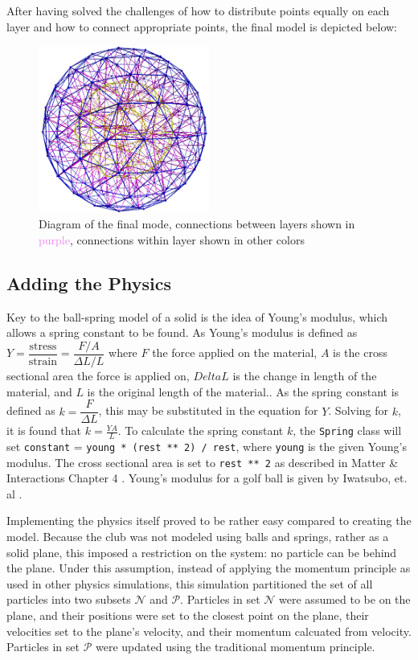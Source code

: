 \documentclass{article}
\begin{document}
After having solved the challenges of how to distribute points equally on each layer and how to connect appropriate points, the final model is depicted below:

\begin{figure}[h]
\centering
\includegraphics[width = 0.5\textwidth]{ball_spring_model.png}
\caption{Diagram of the final mode, connections between layers shown in \textcolor{violet}{purple}, connections within layer shown in other colors}
\label{fig:model}
\end{figure}

\subsection{Adding the Physics}

Key to the ball-spring model of a solid is the idea of Young's modulus, which allows a spring constant to be found. As Young's modulus is defined as $Y = \dfrac{\text{stress}}{\text{strain}} = \dfrac{F/A}{\Delta L/L}$ where $F$ the force applied on the material, $A$ is the cross sectional area the force is applied on, $Delta L$ is the change in length of the material, and $L$ is the original length of the material.. As the spring constant is defined as $k = \dfrac{F}{\Delta L}$, this may be substituted in the equation for $Y$. Solving for $k$, it is found that $k = \frac{YA}{L}$. To calculate the spring constant $k$, the \texttt{Spring} class will set \texttt{constant} = \texttt{young * (rest ** 2) / rest}, where \texttt{young} is the given Young's modulus. The cross sectional area is set to \texttt{rest ** 2} as described in Matter \& Interactions Chapter 4 \cite{sherwood}. Young's modulus for a golf ball is given by Iwatsubo, et. al \cite{young}.

Implementing the physics itself proved to be rather easy compared to creating the model. Because the club was not modeled using balls and springs, rather as a solid plane, this imposed a restriction on the system: no particle can be behind the plane. Under this assumption, instead of applying the momentum principle as used in other physics simulations, this simulation partitioned the set of all particles into two subsets $\mathcal{N}$ and $\mathcal{P}$. Particles in set $\mathcal{N}$ were assumed to be on the plane, and their positions were set to the closest point on the plane, their velocities set to the plane's velocity, and their momentum calcuated from velocity. Particles in set $\mathcal{P}$ were updated using the traditional momentum principle.
\end{document}
